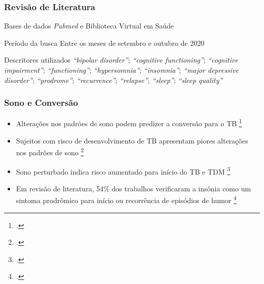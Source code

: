 \documentclass{beamer}
\begin{document}
\begin{frame}
    \frametitle{Revisão de Literatura}

    \begin{block}{Bases de dados}
        \emph{Pubmed} e Biblioteca Virtual em Saúde
    \end{block}

    \begin{block}{Período da busca}
        Entre os meses de setembro e outubro de 2020
    \end{block}

    \begin{block}{Descritores utilizados}
        \textit{``bipolar disorder''};
        \textit{``cognitive functioning''}; \textit{``cognitive impairment''};
        \textit{``functioning''}; \textit{``hypersomnia''};
        \textit{``insomnia''}; \textit{``major depressive disorder''};
        \textit{``prodrome''}; \textit{``recurrence''}; \textit{``relapse''};
        \textit{``sleep''}; \textit{``sleep quality''}
    \end{block}

    \centering

\end{frame}

\begin{frame}
\frametitle{Sono e Conversão}

    \begin{itemize}
        
        \item Alterações nos padrões de sono podem predizer a conversão para o
        TB
        \footcite{melo_sleep_2016}

        \item Sujeitos com risco de desenvolvimento de TB apresentam piores
        alterações nos padrões de sono
        \footcite{zanini_abnormalities_2015,
        ritter_characteristics_2012}

        \item Sono perturbado indica risco aumentado para início do TB e TDM
        \footcite{ritter_disturbed_2015}

        \item Em revisão de literatura, 54\% dos trabalhos verificaram a insônia
        como um sintoma prodrômico para início ou recorrência de episódios de humor
        \footcite{van_meter_bipolar_2016}

    \end{itemize}

\end{frame}
\end{document}
